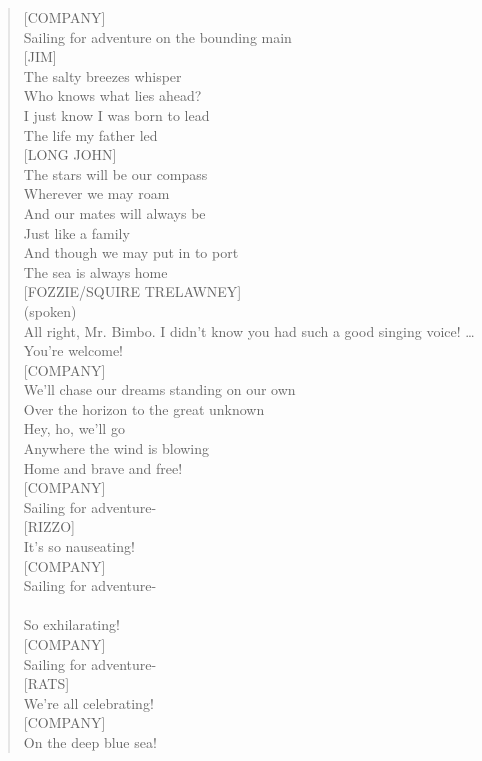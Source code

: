 \documentclass[11pt]{article}
\begin{document}
\begin{verse}
[COMPANY]\\
Sailing for adventure on the bounding main\\
\vspace*{1em}
[JIM]\\
The salty breezes whisper\\
Who knows what lies ahead?\\
I just know I was born to lead\\
The life my father led\\
\vspace*{1em}
[LONG JOHN]\\
The stars will be our compass\\
Wherever we may roam\\
And our mates will always be\\
Just like a family\\
And though we may put in to port\\
The sea is always home\\
\vspace*{1em}
[FOZZIE/SQUIRE TRELAWNEY]\\
(spoken)\\
All right, Mr. Bimbo. I didn't know you had such a good singing voice! \ldots{} You're welcome!\\
\vspace*{1em}
[COMPANY]\\
We'll chase our dreams standing on our own\\
Over the horizon to the great unknown\\
\vspace*{1em}
Hey, ho, we'll go\\
Anywhere the wind is blowing\\
Home and brave and free!\\
\vspace*{1em}
[COMPANY]\\
Sailing for adventure-\\
\vspace*{1em}
[RIZZO]\\
It's so nauseating!\\
\vspace*{1em}
[COMPANY]\\
Sailing for adventure-\\
[GONZO]\\
So exhilarating!\\
\vspace*{1em}
[COMPANY]\\
Sailing for adventure-\\
\vspace*{1em}
[RATS]\\
We're all celebrating!\\
\vspace*{1em}
[COMPANY]\\
On the deep blue sea!\\
\end{verse}
\clearpage
\end{document}
